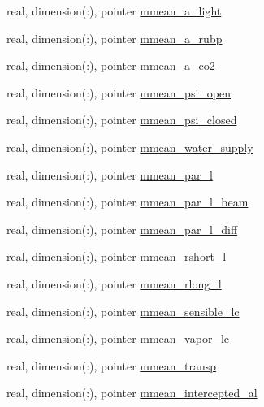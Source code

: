 \begin{DoxyCompactItemize}
\item 
real, dimension(\+:), pointer \hyperlink{structed__state__vars_1_1edtype_a320cbc1031f2e566b347844889f75440}{mmean\+\_\+a\+\_\+light}
\item 
real, dimension(\+:), pointer \hyperlink{structed__state__vars_1_1edtype_a8246bef6e43aa5b5806a21e2b66c4bd0}{mmean\+\_\+a\+\_\+rubp}
\item 
real, dimension(\+:), pointer \hyperlink{structed__state__vars_1_1edtype_aaa271e7c18c3b0386e0274d9f93c0a11}{mmean\+\_\+a\+\_\+co2}
\item 
real, dimension(\+:), pointer \hyperlink{structed__state__vars_1_1edtype_ae2e791c12d8e68ae1d4bf3bc6f1bf198}{mmean\+\_\+psi\+\_\+open}
\item 
real, dimension(\+:), pointer \hyperlink{structed__state__vars_1_1edtype_a7ecbc501fec3207f3460f4479d861466}{mmean\+\_\+psi\+\_\+closed}
\item 
real, dimension(\+:), pointer \hyperlink{structed__state__vars_1_1edtype_aa316596d4b1a88a49e40ade95b619374}{mmean\+\_\+water\+\_\+supply}
\item 
real, dimension(\+:), pointer \hyperlink{structed__state__vars_1_1edtype_a77ce9742a805e9861381433cb08c57bb}{mmean\+\_\+par\+\_\+l}
\item 
real, dimension(\+:), pointer \hyperlink{structed__state__vars_1_1edtype_a2df3429e4d0243c0b2c670f825c38591}{mmean\+\_\+par\+\_\+l\+\_\+beam}
\item 
real, dimension(\+:), pointer \hyperlink{structed__state__vars_1_1edtype_a0efdcd57b2fe9cf9241c036b52d395c5}{mmean\+\_\+par\+\_\+l\+\_\+diff}
\item 
real, dimension(\+:), pointer \hyperlink{structed__state__vars_1_1edtype_acd90df150515e79fd8d793485d365358}{mmean\+\_\+rshort\+\_\+l}
\item 
real, dimension(\+:), pointer \hyperlink{structed__state__vars_1_1edtype_ad808b85bfdc969da58ebf8d46eedc645}{mmean\+\_\+rlong\+\_\+l}
\item 
real, dimension(\+:), pointer \hyperlink{structed__state__vars_1_1edtype_ae2c9b665f77bfb8e2f119601e56f9146}{mmean\+\_\+sensible\+\_\+lc}
\item 
real, dimension(\+:), pointer \hyperlink{structed__state__vars_1_1edtype_a3483a8c91a010bdfd897c7074a7b9306}{mmean\+\_\+vapor\+\_\+lc}
\item 
real, dimension(\+:), pointer \hyperlink{structed__state__vars_1_1edtype_a808ec809f2a3e4ce2f01fe2771476e15}{mmean\+\_\+transp}
\item 
real, dimension(\+:), pointer \hyperlink{structed__state__vars_1_1edtype_a92db9fd24c632044d3e775ec310e29eb}{mmean\+\_\+intercepted\+\_\+al}

\end{DoxyCompactItemize}
